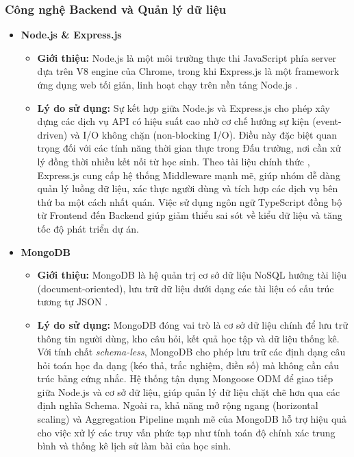 \subsubsection{Công nghệ Backend và Quản lý dữ liệu}
\begin{itemize}
	\item \textbf{Node.js \& Express.js}
	\begin{itemize}
		\item \textbf{Giới thiệu:} Node.js là một môi trường thực thi JavaScript phía server dựa trên V8 engine của Chrome, trong khi Express.js là một framework ứng dụng web tối giản, linh hoạt chạy trên nền tảng Node.js \cite{nodejs, expressjs}.
		\item \textbf{Lý do sử dụng:} Sự kết hợp giữa Node.js và Express.js cho phép xây dựng các dịch vụ API có hiệu suất cao nhờ cơ chế hướng sự kiện (event-driven) và I/O không chặn (non-blocking I/O). Điều này đặc biệt quan trọng đối với các tính năng thời gian thực trong Đấu trường, nơi cần xử lý đồng thời nhiều kết nối từ học sinh. Theo tài liệu chính thức \cite{expressjs}, Express.js cung cấp hệ thống Middleware mạnh mẽ, giúp nhóm dễ dàng quản lý luồng dữ liệu, xác thực người dùng và tích hợp các dịch vụ bên thứ ba một cách nhất quán. Việc sử dụng ngôn ngữ TypeScript đồng bộ từ Frontend đến Backend giúp giảm thiểu sai sót về kiểu dữ liệu và tăng tốc độ phát triển dự án.
	\end{itemize}
	
	\item \textbf{MongoDB} 
	\begin{itemize}
		\item \textbf{Giới thiệu:} MongoDB là hệ quản trị cơ sở dữ liệu NoSQL hướng tài liệu (document-oriented), lưu trữ dữ liệu dưới dạng các tài liệu có cấu trúc tương tự JSON \cite{mongodb}.
		\item \textbf{Lý do sử dụng:} MongoDB đóng vai trò là cơ sở dữ liệu chính để lưu trữ thông tin người dùng, kho câu hỏi, kết quả học tập và dữ liệu thống kê. Với tính chất \textit{schema-less}, MongoDB cho phép lưu trữ các định dạng câu hỏi toán học đa dạng (kéo thả, trắc nghiệm, điền số) mà không cần cấu trúc bảng cứng nhắc. Hệ thống tận dụng Mongoose ODM để giao tiếp giữa Node.js và cơ sở dữ liệu, giúp quản lý dữ liệu chặt chẽ hơn qua các định nghĩa Schema. Ngoài ra, khả năng mở rộng ngang (horizontal scaling) và Aggregation Pipeline mạnh mẽ của MongoDB hỗ trợ hiệu quả cho việc xử lý các truy vấn phức tạp như tính toán độ chính xác trung bình và thống kê lịch sử làm bài của học sinh.
	\end{itemize}
	

\end{itemize}
